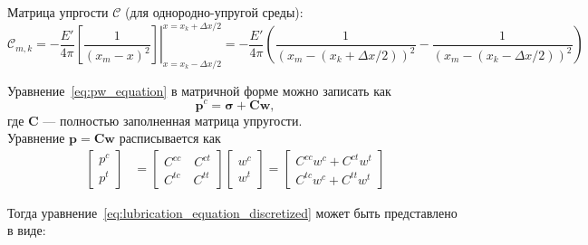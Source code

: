 \documentclass[11pt,a4paper,russian,dvipsnames ]{article}
\begin{document}
Матрица упргости $\mathcal{C}$ (для однородно-упругой среды):
\begin{equation}
	\mathcal{C}_{m,k} = - \frac{E'}{4 \pi} \left. \left[ \frac{1}{(x_m - x)^2} \right] \right\vert^{x = x_k + \Delta x / 2}_{x = x_k - \Delta x / 2} = - \frac{E'}{4 \pi} \left( \frac{1}{(x_m - (x_k + \Delta x / 2))^2} - \frac{1}{(x_m - (x_k - \Delta x / 2))^2} \right)
\end{equation}
	
Уравнение~\eqref{eq:pw_equation} в матричной форме можно записать как
\begin{equation}
	\bm{p}^c = \bm{\sigma} + \bm{C} \bm {w},
\end{equation}	
где $\bm{C}$ --- полностью заполненная матрица упругости. \\

Уравнение $\bm{p} = \bm{C} \bm{w}$ расписывается как
\begin{align}
		\begin{bmatrix}
			p^c \\           
			p^t 		
		\end{bmatrix}
	& = 	
		\begin{bmatrix}
			C^{cc} \quad C^{ct} \\           			
			C^{tc} \quad C^{tt}
		\end{bmatrix} 
		\begin{bmatrix}
			w^c \\
			w^t
		\end{bmatrix}
		=
		\begin{bmatrix}
			C^{cc} w^c + C^{ct} w^t \\
			C^{tc} w^c + C^{tt} w^t
		\end{bmatrix}
\end{align}

Тогда уравнение~\eqref{eq:lubrication_equation_discretized} может быть представлено в виде:
\end{document}
